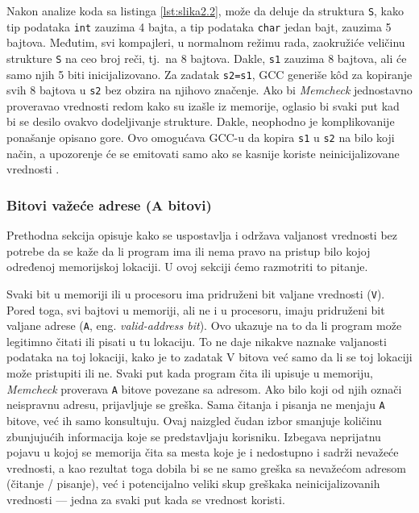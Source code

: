 \documentclass[12pt,oneside]{memoir}
\theoremstyle{plain}
\theoremstyle{definition}
\begin{document}

Nakon analize koda sa listinga \ref{lst:slika2.2}, može da deluje da struktura \texttt{S}, kako tip podataka \texttt{int} zauzima 4 bajta, a tip podataka \texttt{char} jedan bajt, zauzima 5 bajtova. Međutim, svi kompajleri, u normalnom režimu rada, zaokružiće veličinu strukture \texttt{S} na ceo broj reči, tj.~na 8 bajtova. Dakle, \texttt{s1} zauzima 8 bajtova, ali će samo njih 5 biti inicijalizovano. Za zadatak \texttt{s2=s1}, GCC generiše k\^od za kopiranje svih 8 bajtova u \texttt{s2} bez obzira na njihovo značenje. Ako bi \textit{Memcheck} jednostavno proveravao vrednosti redom kako su izašle iz memorije, oglasio bi svaki put kad bi se desilo ovakvo dodeljivanje strukture. Dakle, neophodno je komplikovanije ponašanje opisano gore. Ovo omogućava GCC-u da kopira \texttt{s1} u \texttt{s2} na bilo koji način, a upozorenje će se emitovati samo ako se kasnije koriste neinicijalizovane vrednosti \cite{Memcheck}. 

\subsubsection{Bitovi važeće adrese (A bitovi)}
Prethodna sekcija opisuje kako se uspostavlja i održava valjanost vrednosti bez potrebe da se kaže da li program ima ili nema pravo na pristup bilo kojoj određenoj memorijskoj lokaciji. U ovoj sekciji ćemo razmotriti to pitanje.

Svaki bit u memoriji ili u procesoru ima pridruženi bit valjane vrednosti (\texttt{V}). Pored toga, svi bajtovi u memoriji, ali ne i u procesoru, imaju pridruženi bit valjane adrese (\texttt{A}, eng. \textit{valid-address bit}). Ovo ukazuje na to da li program može legitimno čitati ili pisati u tu lokaciju. To ne daje nikakve naznake valjanosti podataka na toj lokaciji, kako je to zadatak V bitova već samo da li se toj lokaciji može pristupiti ili ne. Svaki put kada program čita ili upisuje u memoriju, \textit{Memcheck} proverava \texttt{A} bitove povezane sa adresom. Ako bilo koji od njih označi neispravnu adresu, prijavljuje se greška. Sama čitanja i pisanja ne menjaju \texttt{A} bitove, već ih samo konsultuju. Ovaj naizgled čudan izbor smanjuje količinu zbunjujućih informacija koje se predstavljaju korisniku. Izbegava neprijatnu pojavu u kojoj se memorija čita sa mesta koje je i nedostupno i sadrži nevažeće vrednosti, a kao rezultat toga dobila bi se ne samo greška sa nevažećom adresom (čitanje / pisanje), već i potencijalno veliki skup greškaka neinicijalizovanih vrednosti --- jedna za svaki put kada se vrednost koristi.
\end{document}
